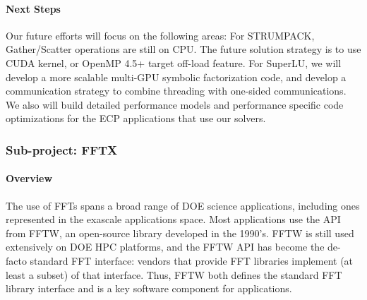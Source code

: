 \paragraph{Next Steps} Our future efforts will focus on the following areas:
For STRUMPACK, Gather/Scatter operations are still on CPU. The future
 solution strategy is to use CUDA kernel, or OpenMP 4.5+ target off-load feature.
For SuperLU, we will develop a more scalable multi-GPU symbolic
  factorization code, and develop a communication strategy to 
  combine threading with one-sided communications.
We also will build detailed performance models and performance specific
  code optimizations for the ECP applications that use our solvers.


\subsubsection{ Sub-project: FFTX} \label{subsubsect:fftx}
\noindent

\paragraph{Overview}
The use of FFTs spans a broad range of DOE science applications, including ones represented in the exascale applications space. Most applications use the API from FFTW, an open-source library developed in the 1990's. FFTW is still used extensively on DOE HPC platforms, and the FFTW API has become the de-facto
standard FFT interface: vendors that provide FFT libraries implement
(at least a subset) of that interface. Thus, FFTW both defines the 
standard FFT library interface and is a key software component
for applications.

